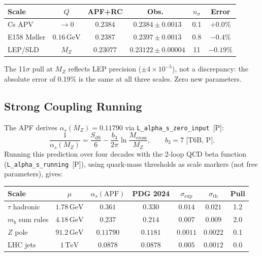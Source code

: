 \documentclass[11pt]{article}
\begin{document}
\begin{center}\small
\begin{tabular}{lccccc}
\toprule
Scale & $Q$ & APF+RC & Obs.\ & $n_\sigma$ & Error \\
\midrule
Cs APV & $\to 0$ & $0.2384$ & $0.2384\pm0.0013$ & 0.1 & $+0.0\%$ \\
E158 M\o{}ller & $0.16\,\mathrm{GeV}$ & $0.2387$ & $0.2397\pm0.0013$ & 0.8 & $-0.4\%$ \\
LEP/SLD & $M_Z$ & $0.23077$ & $0.23122\pm0.00004$ & 11 & $-0.19\%$ \\
\bottomrule
\end{tabular}
\end{center}

The 11$\sigma$ pull at $M_Z$ reflects LEP precision ($\pm 4\times10^{-5}$), not a discrepancy: the absolute error of 0.19\% is the same at all three scales.  Zero new parameters.


\subsection{Strong Coupling Running}

The APF derives $\alpha_s(M_Z) = 0.11790$ via \texttt{L\_alpha\_s\_zero\_input}~[P]:
\[
\frac{1}{\alpha_s(M_Z)} = \frac{S_{\mathrm{dS}}}{6} - \frac{b_3}{2\pi}\ln\frac{M_{\mathrm{cross}}}{M_Z},
\qquad b_3 = 7 \;\text{[T6B, P]}.
\]
Running this prediction over four decades with the 2-loop QCD beta function (\texttt{L\_alpha\_s\_running}~[P]), using quark-mass thresholds as scale markers (not free parameters), gives:

\begin{center}\small
\begin{tabular}{lcccccc}
\toprule
Scale & $\mu$ & $\alpha_s(\text{APF})$ & PDG 2024 & $\sigma_{\mathrm{exp}}$ & $\sigma_{\mathrm{th}}$ & Pull \\
\midrule
$\tau$ hadronic & $1.78\,\mathrm{GeV}$ & $0.361$ & $0.330$ & $0.014$ & $0.021$ & 1.2 \\
$m_b$ sum rules & $4.18\,\mathrm{GeV}$ & $0.237$ & $0.214$ & $0.007$ & $0.009$ & 2.0 \\
$Z$ pole & $91.2\,\mathrm{GeV}$ & $0.11790$ & $0.1181$ & $0.0011$ & $0.0022$ & 0.1 \\
LHC jets & $1\,\mathrm{TeV}$ & $0.0878$ & $0.0878$ & $0.005$ & $0.0012$ & 0.0 \\
\bottomrule
\end{tabular}
\end{center}
\end{document}
